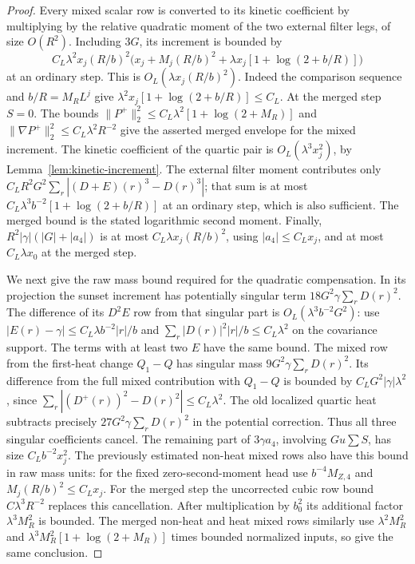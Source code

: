 \documentclass[11pt]{article}
\theoremstyle{definition}
\begin{document}
\begin{proof}
Every mixed scalar row is converted to its kinetic
coefficient by multiplying by the relative quadratic
moment of the two external filter legs, of size \(O(R^2)\).
Including \(3G\), its increment is bounded by
\begin{equation}
 C_L\lambda^2 x_j (R/b)^2
    \bigl(x_j+M_j(R/b)^2
             +\lambda x_j[1+\log(2+b/R)]\bigr)
\end{equation}
at an ordinary step. This is \(O_L(\lambda x_j(R/b)^2)\).
Indeed the comparison sequence and \(b/R=M_RL^j\)
give \(\lambda^2x_j[1+\log(2+b/R)]\le C_L\).
At the merged step \(S=0\). The bounds
\(\|P^+\|_2^2\le C_L\lambda^2[1+\log(2+M_R)]\) and
\(\|\nabla P^+\|_2^2\le C_L\lambda^2R^{-2}\) give the
asserted merged envelope for the mixed increment.
The kinetic coefficient of the quartic pair is
\(O_L(\lambda^3 x_j^2)\), by
Lemma~\ref{lem:kinetic-increment}. The external filter
moment contributes only
\(C_LR^2 G^2\sum_r |(D+E)(r)^3-D(r)^3|\);
that sum is at most \(C_L\lambda^3 b^{-2}
[1+\log(2+b/R)]\) at an ordinary step, which is
also sufficient. The merged bound is the stated
logarithmic second moment. Finally,
\(R^2|\gamma| (|G|+|a_4|)\) is at most
\(C_L\lambda x_j(R/b)^2\), using
\(|a_4|\le C_L x_j\), and at most \(C_L\lambda x_0\)
at the merged step.

We next give the raw mass bound required for the
quadratic compensation. In its projection the sunset
increment has potentially singular term
\(18G^2\gamma\sum_r D(r)^2\). The difference of its
\(D^2E\) row from that singular part is \(O_L(\lambda^3
b^{-2}G^2)\): use
\(|E(r)-\gamma|\le C_L\lambda b^{-2}|r|/b\) and
\(\sum_r |D(r)|^2|r|/b\le C_L\lambda^2\) on the
covariance support. The terms with at least two \(E\)
have the same bound. The mixed row from the first-heat
change \(Q_1-Q\) has singular mass
\(9G^2\gamma\sum_r D(r)^2\). Its difference from the
full mixed contribution with \(Q_1-Q\) is bounded by
\(C_L G^2|\gamma|\lambda^2\), since
\(\sum_r|(D^+(r))^2-D(r)^2|\le C_L\lambda^2\).
The old localized quartic heat subtracts precisely
\(27G^2\gamma\sum_r D(r)^2\) in the potential correction.
Thus all three singular coefficients cancel. The
remaining part of \(3\gamma a_4\), involving \(Gu\sum S\),
has size \(C_Lb^{-2}x_j^2\). The previously estimated
non-heat mixed rows also have this bound in raw mass
units: for the fixed zero-second-moment head use
\(b^{-4}M_{Z,4}\) and \(M_j(R/b)^2\le C_Lx_j\).
For the merged step the uncorrected cubic row bound
\(C\lambda^3R^{-2}\) replaces this cancellation.
After multiplication by \(b_0^2\) its additional factor
\(\lambda^3 M_R^2\) is bounded. The merged non-heat and
heat mixed rows similarly use
\(\lambda^2 M_R^2\) and \(\lambda^3 M_R^2[1+\log(2+M_R)]\)
times bounded normalized inputs, so give the same
conclusion.


\end{proof}
\end{document}

